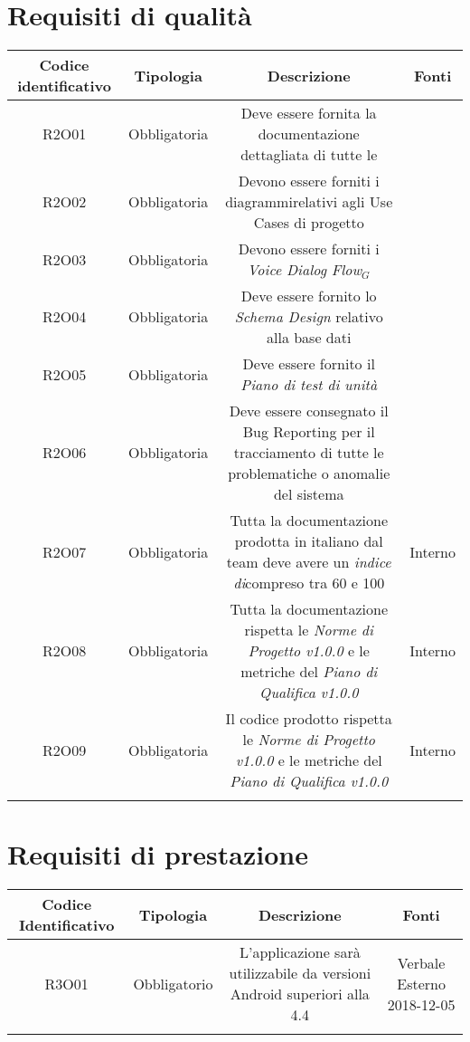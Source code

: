 \section{Requisiti di qualità}
\begin{tabularx}{\textwidth}{|C|C|C|C|}
	\hline
	\textbf{Codice identificativo}& \textbf{Tipologia} & \textbf{Descrizione} & \textbf{Fonti} \\
	\hline
	\endhead
	R2O01 & Obbligatoria &Deve essere fornita la documentazione dettagliata di tutte le & \\
	\hline
	R2O02 &Obbligatoria & Devono essere forniti i diagrammirelativi agli Use Cases di progetto  & \\
	\hline
	R2O03 &Obbligatoria & Devono essere forniti i \textit{Voice Dialog Flow$_{G}$} & \\
	\hline
	R2O04 &Obbligatoria & Deve essere fornito lo \textit{Schema Design} relativo alla base dati  & \\
	\hline
	R2O05 &Obbligatoria & Deve essere fornito il \textit{Piano di test di unità} & \\
	\hline
	R2O06 &Obbligatoria & Deve essere consegnato il Bug Reporting per il tracciamento di
	tutte le problematiche o anomalie del sistema & \\
	\hline
	R2O07 &Obbligatoria & Tutta la documentazione prodotta in italiano dal team deve avere
	un \textit{indice di}compreso tra 60 e 100 & Interno\\
	\hline
	R2O08 &Obbligatoria & Tutta la documentazione rispetta le \textit{Norme di Progetto v1.0.0} e le metriche del \textit{Piano di Qualifica v1.0.0}& Interno\\
	\hline
	R2O09 &Obbligatoria & Il codice prodotto rispetta le \textit{Norme di Progetto v1.0.0} e le metriche del \textit{Piano di Qualifica v1.0.0}& Interno\\
	\hline
    \caption{Tabella requisiti di qualità}
\end{tabularx}

\section{Requisiti di prestazione}
\begin{tabularx}{\textwidth}{|C|C|C|C|}
	\hline
	\textbf{Codice Identificativo}& \textbf{Tipologia} & \textbf{Descrizione} & \textbf{Fonti}\\
	\hline	
	\endhead
	R3O01&Obbligatorio  & L'applicazione sarà utilizzabile da versioni Android superiori alla 4.4 & Verbale Esterno 2018-12-05 \\
	\hline

	\caption{Tabella requisiti di prestazione}
\end{tabularx}




